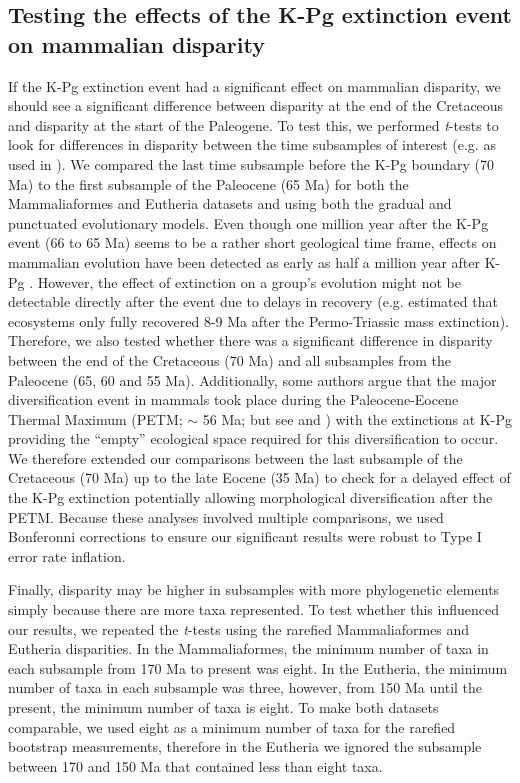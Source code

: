 \documentclass[10pt,letterpaper]{article}
\begin{document}
\subsection*{Testing the effects of the K-Pg extinction event on mammalian disparity}
If the K-Pg extinction event had a significant effect on mammalian disparity, we should see a significant difference between disparity at the end of the Cretaceous and disparity at the start of the Paleogene.
To test this, we performed \textit{t}-tests to look for differences in disparity between the time subsamples of interest (e.g. as used in \cite{anderson2012using,zelditch2012geometric,smith2014joined}).
We compared the last time subsample before the K-Pg boundary (70 Ma) to the first subsample of the Paleocene (65 Ma) for both the Mammaliaformes and Eutheria datasets and using both the gradual and punctuated evolutionary models.
Even though one million year after the K-Pg event (66 to 65 Ma) seems to be a rather short geological time frame, effects on mammalian evolution have been detected as early as half a million year after K-Pg \cite{Wilson2013}.
However, the effect of extinction on a group's evolution might not be detectable directly after the event due to delays in recovery (e.g. \cite{chen2012timing} estimated that ecosystems only fully recovered 8-9 Ma after the Permo-Triassic mass extinction).
Therefore, we also tested whether there was a significant difference in disparity between the end of the Cretaceous (70 Ma) and all subsamples from the Paleocene (65, 60 and 55 Ma).
Additionally, some authors argue that the major diversification event in mammals took place during the Paleocene-Eocene Thermal Maximum (PETM; $\sim$ 56 Ma; \cite{bininda-emondsthe2007} but see \cite{meredithimpacts2011} and \cite{Stadler12042011}) with the extinctions at K-Pg providing the ``empty'' ecological space required for this diversification to occur.
We therefore extended our comparisons between the last subsample of the Cretaceous (70 Ma) up to the late Eocene (35 Ma) to check for a delayed effect of the K-Pg extinction potentially allowing morphological diversification after the PETM. 
Because these analyses involved multiple comparisons, we used Bonferonni corrections \cite{holm1979simple} to ensure our significant results were robust to Type I error rate inflation. 

Finally, disparity may be higher in subsamples with more phylogenetic elements simply because there are more taxa represented.
To test whether this influenced our results, we repeated the \textit{t}-tests using the rarefied Mammaliaformes and Eutheria disparities.
In the Mammaliaformes, the minimum number of taxa in each subsample from 170 Ma to present was eight.
In the Eutheria, the minimum number of taxa in each subsample was three, however, from 150 Ma until the present, the minimum number of taxa is eight.
To make both datasets comparable, we used eight as a minimum number of taxa for the rarefied bootstrap measurements, therefore in the Eutheria we ignored the subsample between 170 and 150 Ma that contained less than eight taxa.
\end{document}
